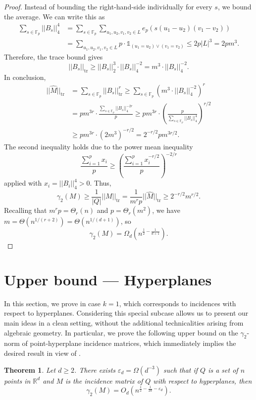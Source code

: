 \documentclass[11pt]{article}
\theoremstyle{plain}
\newtheorem{theorem}{Theorem}[section]
\theoremstyle{definition}
\DeclareMathOperator{\tr}{tr}
\newcommand{\eps}{\varepsilon}
\begin{document}
\begin{proof}
		Instead of bounding the right-hand-side individually for every $s$, we bound the average. We can write this as
		\begin{align*}
			\sum_{s\in\mathbb{F}_p}||B_s||_4^4&=\sum_{s\in \mathbb{F}_p}\sum_{u_1,u_2,v_1,v_2\in L} e_p(s(u_1-u_2)(v_1-v_2))\\
			&=\sum_{u_1,u_2,v_1,v_2\in L}p\cdot\mathds{1}_{(u_1=u_2)\vee (v_1=v_2)}\leq  2p|L|^3=2pm^3.
		\end{align*}
		Therefore, the trace bound gives 
		$$||B_s||_{\tr}\geq ||B_s||_2^3 \cdot ||B_s||_4^{-2}=m^{3}\cdot ||B_s||_4^{-2}.$$
		In conclusion,
		\begin{align*}
			||\hat{M}||_{\tr}&=\sum_{s\in \mathbb{F}_p}||B_s||_{\tr}^r
            \geq \sum_{s\in \mathbb{F}_p}(m^3\cdot ||B_s||_4^{-2})^r\\
			&=pm^{3r}\cdot \frac{\sum_{s\in \mathbb{F}_p} ||B_s||_4^{-2r}}{p}
			\geq pm^{3r}\cdot \left(\frac{p}{\sum_{s\in \mathbb{F}_p} ||B_s||_4^4}\right)^{r/2}\\
			&\geq pm^{3r}\cdot (2m^3)^{-r/2}=2^{-r/2}pm^{3r/2}.
		\end{align*}
		The second inequality holds due to the power mean inequality 
        $$\frac{\sum_{i=1}^px_i}{p}\geq \left(\frac{\sum_{i=1}^p x_{i}^{-r/2}}{p}\right)^{-2/r}$$
        applied with $x_i=||B_i||_4^4>0$. Thus,
		$$\gamma_2(M)\geq \frac{1}{|Q|}||M||_{\tr}=\frac{1}{m^rp}||\hat{M}||_{\tr}\geq 2^{-r/2}m^{r/2}.$$
		Recalling that $m^rp=\Theta_r(n)$ and $p=\Theta_r(m^2)$, we have $m=\Theta(n^{1/(r+2)})=\Theta(n^{1/(d+1)})$, so
		$$\gamma_2(M)=\Omega_d\left(n^{\frac{1}{2}-\frac{1}{d+1}}\right).$$
	\end{proof}
	
	\section{Upper bound --- Hyperplanes}\label{sect:hyperplanes}
	
	In this section, we prove  in case $k=1$, which corresponds to incidences with respect to hyperplanes. Considering this special subcase  allows us to present our main ideas in a clean setting, without the additional technicalities arising from algebraic geometry.
	In particular, we prove the following upper bound on the $\gamma_2$-norm of point-hyperplane incidence matrices, which immediately implies the desired result in view of .
	
	\begin{theorem}\label{thm:upper_hyperplane}
		Let $d\geq 2$. There exists $\eps_d=\Omega(d^{-3})$ such that if $Q$ is a set of $n$ points in $\mathbb{R}^d$ and $M$ is the incidence matrix of $Q$ with respect to hyperplanes, then 
		$$\gamma_2(M)=O_d\left(n^{\frac{1}{2}-\frac{1}{2d}-\eps_d}\right).$$
	\end{theorem}
	
\end{document}
